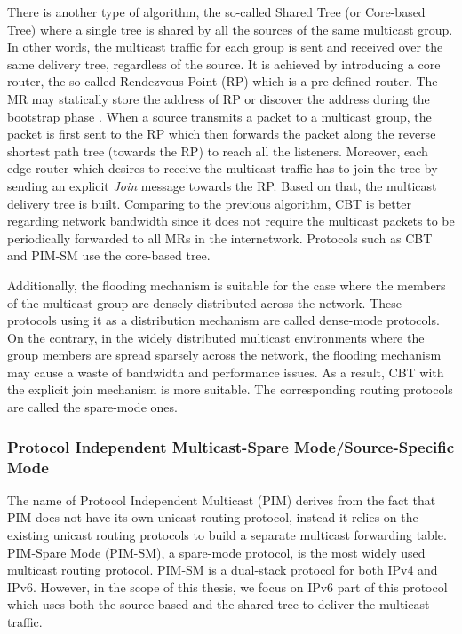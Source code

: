 There is another type of algorithm, the so-called Shared Tree (or Core-based Tree) where a single tree is shared by all the sources of the same multicast group. In other words, the multicast traffic for each group is sent and received over the same delivery tree, regardless of the source. It is achieved by introducing a core router, the so-called Rendezvous Point (RP) which is a pre-defined router. The MR may statically store the address of RP or discover the address during the bootstrap phase \cite{PIM_SM}. When a source transmits a packet to a multicast group, the packet is first sent to the RP which then forwards the packet along the reverse shortest path tree (towards the RP) to reach all the listeners. Moreover, each edge router which desires to receive the multicast traffic has to join the tree by sending an explicit \textit{Join} message towards the RP. Based on that, the multicast delivery tree is built. Comparing to the previous algorithm, CBT is better regarding network bandwidth since it does not require the multicast packets to be periodically forwarded to all MRs in the internetwork. Protocols such as CBT and PIM-SM use the core-based tree. 

Additionally, the flooding mechanism is suitable for the case where the members of the multicast group are densely distributed across the network. These protocols using it as a distribution mechanism are called dense-mode protocols. On the contrary, in the widely distributed multicast environments where the group members are spread sparsely across the network, the flooding mechanism may cause a waste of bandwidth and performance issues. As a result, CBT with the explicit join mechanism is more suitable. The corresponding routing protocols are called the spare-mode ones. 

\subsubsection{Protocol Independent Multicast-Spare Mode/Source-Specific Mode}

The name of Protocol Independent Multicast (PIM) derives from the fact that PIM does not have its own unicast routing protocol, instead it relies on the existing unicast routing protocols to build a separate multicast forwarding table. PIM-Spare Mode (PIM-SM), a spare-mode protocol, is the most widely used multicast routing protocol. PIM-SM is a dual-stack protocol for both IPv4 and IPv6. However, in the scope of this thesis, we focus on IPv6 part of this protocol which uses both the source-based and the shared-tree to deliver the multicast traffic. 

